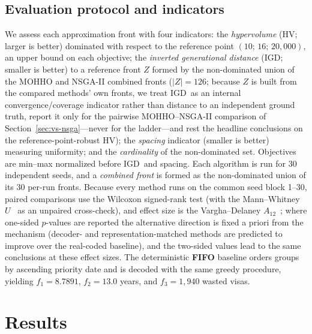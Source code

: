 \documentclass[runningheads]{llncs}
\newcommand{\HV}{\textsf{HV}}
\newcommand{\IGD}{\textsf{IGD}}
\begin{document}
\subsection{Evaluation protocol and indicators}
\label{sec:protocol}

We assess each approximation front with four indicators: the \emph{hypervolume} (\HV; larger is better) dominated with respect to the reference point $(10;\,16;\,20{,}000)$, an upper bound on each objective; the \emph{inverted generational distance} (\IGD; smaller is better) to a reference front $Z$ formed by the non-dominated union of the MOHHO and NSGA-II combined fronts ($|Z|=126$; because $Z$ is built from the compared methods' own fronts, we treat \IGD\ as an internal convergence/coverage indicator rather than distance to an independent ground truth, report it only for the pairwise MOHHO--NSGA-II comparison of Section~\ref{sec:vs-nsga}---never for the ladder---and rest the headline conclusions on the reference-point-robust \HV); the \emph{spacing} indicator (smaller is better) measuring uniformity; and the \emph{cardinality} of the non-dominated set. Objectives are min--max normalized before \IGD\ and spacing. Each algorithm is run for 30 independent seeds, and a \emph{combined front} is formed as the non-dominated union of its 30 per-run fronts. Because every method runs on the common seed block 1--30, paired comparisons use the Wilcoxon signed-rank test (with the Mann--Whitney $U$~\cite{derrac} as an unpaired cross-check), and effect size is the Vargha--Delaney $A_{12}$~\cite{vargha}; where one-sided $p$-values are reported the alternative direction is fixed a priori from the mechanism (decoder- and representation-matched methods are predicted to improve over the real-coded baseline), and the two-sided values lead to the same conclusions at these effect sizes. The deterministic \textbf{FIFO} baseline orders groups by ascending priority date and is decoded with the same greedy procedure, yielding $f_1=8.7891$, $f_2=13.0$ years, and $f_3=1{,}940$ wasted visas.



\section{Results}
\label{sec:results}
\end{document}
